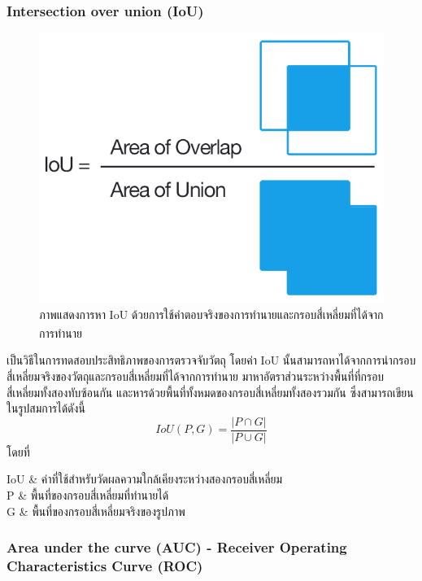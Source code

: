 \subsubsection{Intersection over union (IoU)}
\begin{figure}[!ht]
	\centering
	\includegraphics[scale=0.3]{chapter2/images/iou_equation.png}
		\caption[ภาพแสดงการหา IoU ด้วยการใช้กรอบสี่เหลี่ยมซึ่งเป็นคำตอบจริงและกรอบสี่เหลี่ยมที่ได้จากการทำนาย]{ภาพแสดงการหา IoU ด้วยการใช้คำตอบจริงของการทำนายและกรอบสี่เหลี่ยมที่ได้จากการทำนาย\textsuperscript{\cite{iou_pic}}}
    	\label{fig:iou_equation}
\end{figure}
เป็นวิธีในการทดสอบประสิทธิภาพของการตรวจจับวัตถุ โดยค่า IoU นั้นสามารถหาได้จากการนำกรอบสี่เหลี่ยมจริงของวัตถุและกรอบสี่เหลี่ยมที่ได้จากการทำนาย
มาหาอัตราส่วนระหว่างพื้นที่ที่กรอบสี่เหลี่ยมทั้งสองทับซ้อนกัน และหารด้วยพื้นที่ทั้งหมดของกรอบสี่เหลี่ยมทั้งสองรวมกัน ซึ่งสามารถเขียนในรูปสมการได้ดังนี้
\begin{equation}
IoU(P,G) = \frac{\left| P \cap G \right|}{\left| P \cup  G \right|}					
\end{equation}
โดยที่
\begin{conditions}
IoU			&  ค่าที่ใช้สำหรับวัดผลความใกล้เคียงระหว่างสองกรอบสี่เหลี่ยม    \\
P			&  พื้นที่ของกรอบสี่เหลี่ยมที่ทำนายได้	\\
G			&  พื้นที่ของกรอบสี่เหลี่ยมจริงของรูปภาพ					\\
\end{conditions}

\subsubsection{Area under the curve (AUC) - Receiver Operating Characteristics Curve (ROC)}


